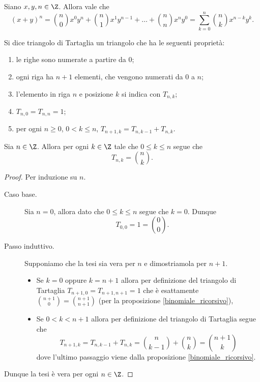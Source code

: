 \begin{theorem} \label{binomiale}
    Siano $x, y, n \in \Z$. Allora vale che
    \begin{equation}
        (x+y)^n = \binom{n}{0}x^0y^n + \binom{n}{1}x^1y^{n-1} + \dots + \binom{n}{n}x^ny^0 = \sum_{k=0}^n \binom{n}{k}x^{n-k}y^k.
    \end{equation}
\end{theorem}

\begin{definition}
    Si dice triangolo di Tartaglia un triangolo che ha le seguenti proprietà:
    \begin{enumerate}
        \item le righe sono numerate a partire da $0$;
        \item ogni riga ha $n + 1$ elementi, che vengono numerati da $0$ a $n$;
        \item l'elemento in riga $n$ e posizione $k$ si indica con $T_{n, k}$;
        \item $T_{n, 0} = T_{n, n} = 1$;
        \item per ogni $n \geq 0$, $0 < k \leq n$, $T_{n + 1, k} = T_{n, k - 1} + T_{n, k}$.
    \end{enumerate}
\end{definition}


\begin{proposition}
    Sia $n \in \Z$. Allora per ogni $k \in \Z$ tale che $0 \leq k \leq n$ segue che \begin{equation}
        T_{n,k} = \binom{n}{k}.
    \end{equation}
\end{proposition}
\begin{proof}
    Per induzione su $n$.
    \begin{description}
        \item[Caso base.]

        Sia $n = 0$, allora dato che $0 \leq k \leq n$ segue che $k = 0$. Dunque
        \[
            T_{0, 0} = 1 = \binom{0}{0}.    
        \]
        \item[Passo induttivo.]
        
        Supponiamo che la tesi sia vera per $n$ e dimostriamola per $n+1$. 
        \begin{itemize}
            \item Se $k = 0$ oppure $k = n + 1$ allora per definizione del triangolo di Tartaglia $T_{n+1, 0} = T_{n+1, n+1} = 1$ che è esattamente $\binom{n+1}{0} = \binom{n+1}{n+1}$ (per la proposizione \ref{binomiale_ricorsivo}),
            \item Se $0 < k < n+1$ allora per definizione del triangolo di Tartaglia segue che \[
                T_{n+1, k} = T_{n, k-1} + T_{n, k} = \binom{n}{k-1} + \binom{n}{k} = \binom{n+1}{k}    
            \] dove l'ultimo passaggio viene dalla proposizione \ref{binomiale_ricorsivo}.
        \end{itemize}
    \end{description}
    Dunque la tesi è vera per ogni $n \in \Z$.
\end{proof}

